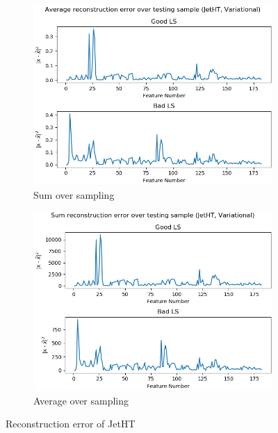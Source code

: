 \begin{figure}[h!]
\centering
    \begin{subfigure}[b]{0.49\linewidth}
        \includegraphics[width=\linewidth]{images/reco/2018/feature_2/avg_sd_Variational_JetHT_f2_1.png}
        \caption{Sum over sampling}
    \end{subfigure}
    \begin{subfigure}[b]{0.49\linewidth}
        \includegraphics[width=\linewidth]{images/reco/2018/feature_2/sum_sd_Variational_JetHT_f2_1.png}
        \caption{Average over sampling}
    \end{subfigure}
    \caption{Reconstruction error of JetHT}
\label{fig:2018_recon_error_jetht}
\end{figure}